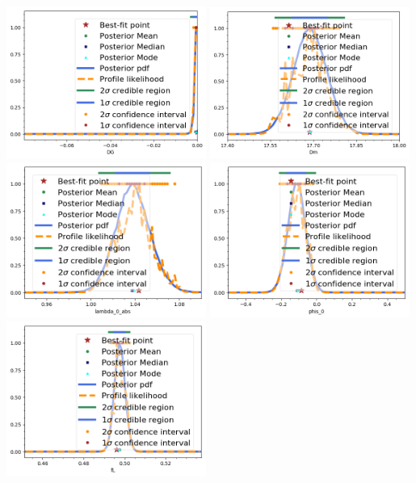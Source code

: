 \begin{center}
\includegraphics[width=0.49\textwidth]{figs/DG.png}
\includegraphics[width=0.49\textwidth]{figs/Dm.png}\\
\includegraphics[width=0.49\textwidth]{figs/lambda_0_abs.png}
\includegraphics[width=0.49\textwidth]{figs/phis_0.png}\\
\includegraphics[width=0.49\textwidth]{figs/fL.png}

\end{center}
